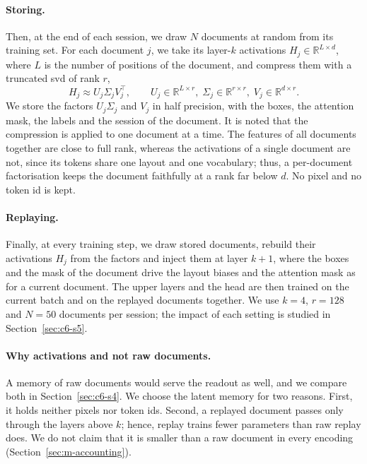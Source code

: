 \paragraph{Storing.} Then, at the end of each session, we draw $N$ documents at random from
its training set. For each document $j$, we take its layer-$k$ activations
$H_j\in\mathbb{R}^{L\times d}$, where $L$ is the number of positions of the document, and
compress them with a truncated \gls{svd} of rank $r$,
\begin{equation}
  H_j\approx U_j\Sigma_jV_j^{\top},\qquad U_j\in\mathbb{R}^{L\times r},\;
  \Sigma_j\in\mathbb{R}^{r\times r},\;V_j\in\mathbb{R}^{d\times r}.
  \label{eq:svd}
\end{equation}
We store the factors $U_j\Sigma_j$ and $V_j$ in half precision, with the boxes, the attention
mask, the labels and the session of the document. It is noted that the compression is
applied to one document at a time. The features of all documents together are close to full
rank, whereas the activations of a single document are not, since its tokens share one
layout and one vocabulary; thus, a per-document factorisation keeps the document faithfully
at a rank far below $d$. No pixel and no token id is kept.

\paragraph{Replaying.} Finally, at every training step, we draw stored documents, rebuild
their activations $H_j$ from the factors and inject them at layer $k{+}1$, where the boxes
and the mask of the document drive the layout biases and the attention mask as for a current
document. The upper layers and the head are then trained on the current batch and on the
replayed documents together. We use $k{=}4$, $r{=}128$ and $N{=}50$ documents per session;
the impact of each setting is studied in Section~\ref{sec:c6-s5}.

\paragraph{Why activations and not raw documents.} A memory of raw documents would serve the
readout as well, and we compare both in Section~\ref{sec:c6-s4}. We choose the latent memory
for two reasons. First, it holds neither pixels nor token ids. Second, a replayed document
passes only through the layers above $k$; hence, replay trains fewer parameters than raw
replay does. We do not claim that it is smaller than a raw document in every encoding
(Section~\ref{sec:m-accounting}).


